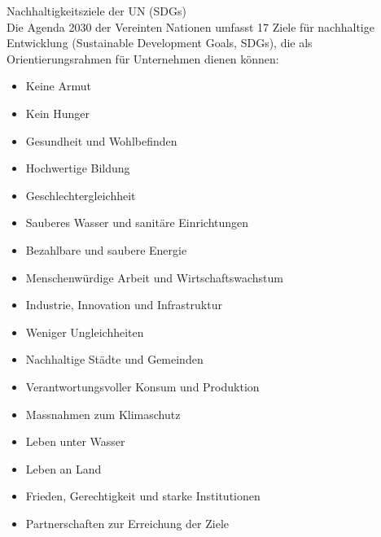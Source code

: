\begin{concept}{Nachhaltigkeitsziele der UN (SDGs)}\\
Die Agenda 2030 der Vereinten Nationen umfasst 17 Ziele für nachhaltige Entwicklung (Sustainable Development Goals, SDGs), die als Orientierungsrahmen für Unternehmen dienen können:
\begin{itemize}
    \item Keine Armut
    \item Kein Hunger
    \item Gesundheit und Wohlbefinden
    \item Hochwertige Bildung
    \item Geschlechtergleichheit
    \item Sauberes Wasser und sanitäre Einrichtungen
    \item Bezahlbare und saubere Energie
    \item Menschenwürdige Arbeit und Wirtschaftswachstum
    \item Industrie, Innovation und Infrastruktur
    \item Weniger Ungleichheiten
    \item Nachhaltige Städte und Gemeinden
    \item Verantwortungsvoller Konsum und Produktion
    \item Massnahmen zum Klimaschutz
    \item Leben unter Wasser
    \item Leben an Land
    \item Frieden, Gerechtigkeit und starke Institutionen
    \item Partnerschaften zur Erreichung der Ziele
\end{itemize}
\end{concept}

